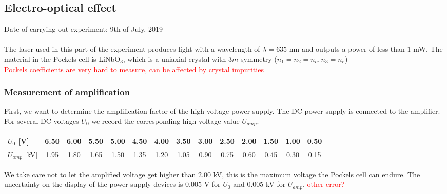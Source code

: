\subsection{Electro-optical effect}
Date of carrying out experiment: 9th of July, 2019 \\ \\
The laser used in this part of the experiment produces light with a
wavelength of $\lambda=635$ nm and outputs a power of less than $1$ mW.
The material in the Pockels cell is  LiNbO$_3$,
which is a uniaxial crystal with $3m$-symmetry ($n_1=n_2=n_o, n_3=n_e$) \\
\textcolor{red}{Pockels coefficients are very hard to measure,
can be affected by crystal impurities}

\subsubsection{Measurement of amplification}
First, we want to determine the amplification factor of the
high voltage power supply. The DC power supply is connected to the
amplifier. For several DC voltages $U_0$ we record the corresponding
high voltage value $U_{amp}$.
\begin{center}
    \begin{tabular}{l|c|c|c|c|c|c|c|c|c|c|c|c|c}
        $U_0$ [V] & 6.50 & 6.00 & 5.50 & 5.00 & 4.50 & 4.00 &
                  3.50 & 3.00 & 2.50 & 2.00 & 1.50 & 1.00 & 0.50 \\
        \hline
        $U_{amp}$ [kV] & 1.95 & 1.80 & 1.65 & 1.50 & 1.35 & 1.20
                       & 1.05 & 0.90 & 0.75 & 0.60 & 0.45 & 0.30 & 0.15
    \end{tabular}
\end{center}
We take care not to let the amplified
voltage get higher than $2.00$ kV, this is the maximum voltage the
Pockels cell can endure. The uncertainty on the display of the power
supply devices is $0.005$ V for $U_0$ and $0.005$ kV for $U_{amp}$.
\textcolor{red}{other error?}

